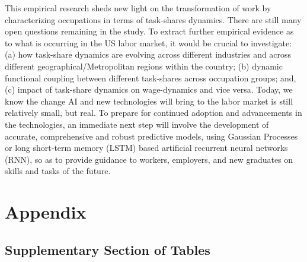 \documentclass[letterpaper]{article} %
\begin{document}
\par
This empirical research sheds new light on the transformation of work by characterizing occupations in terms of task-shares dynamics. There are still many open questions remaining in the study. To extract further empirical evidence as to what is occurring in the US labor market, it would be crucial to investigate: (a) how task-share dynamics are evolving across different industries and across different geographical/Metropolitan regions within the country; (b) dynamic functional coupling between different task-shares across occupation groups; and, (c) impact of task-share dynamics on wage-dynamics and vice versa. Today, we know the change AI and new technologies will bring to the labor market is still relatively small, but real. To prepare for continued adoption and advancements in the technologies, an immediate next step will involve the development of accurate, comprehensive and robust predictive models, using Gaussian Processes or long short-term memory (LSTM) based artificial recurrent neural networks (RNN), so as to provide guidance to workers, employers, and new graduates on skills and tasks of the future.






\clearpage


\appendix
\section{Appendix}

\vskip20pt
\subsection{Supplementary Section of Tables}
\end{document}
